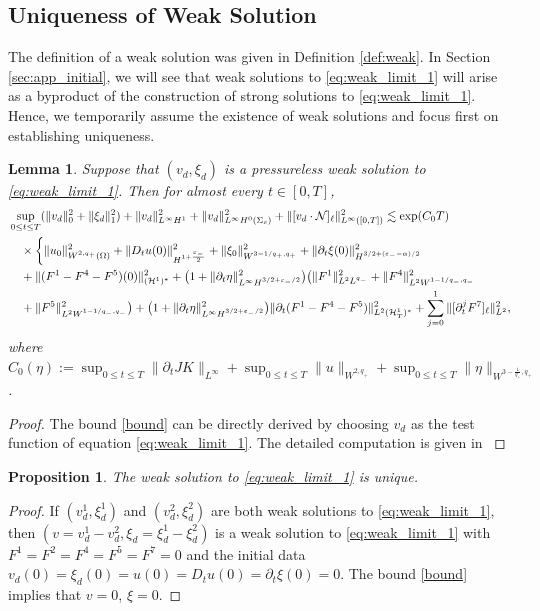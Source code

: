 \documentclass[letterpaper,reqno,10pt,twoside]{amsart}
\newtheorem{lemma}[theorem]{Lemma}
\newtheorem{proposition}[theorem]{Proposition}
\theoremstyle{definition}
\theoremstyle{remark}
\def\p{\partial}
\def\Om{\Omega}
\begin{document}
	
	\subsection{Uniqueness of Weak Solution}
	
	
	The definition of a weak solution was given in Definition \ref{def:weak}.
	In Section \ref{sec:app_initial}, we will see that weak solutions to \eqref{eq:weak_limit_1} will arise  as a byproduct of the construction of strong solutions to \eqref{eq:weak_limit_1}. Hence, we temporarily assume the existence of weak solutions and focus first on establishing uniqueness.
	
	\begin{lemma}{\label{elemma}}
		Suppose that $(v_{d}, \xi_{d})$ is a pressureless weak solution to \eqref{eq:weak_limit_1}. Then for almost every $t\in [0,T]$,
		\begin{equation}{\label{bound}}
			\begin{aligned}
				&\sup_{0\le t\le T}(\|v_{d}\|_{0}^2+\|\xi_{d}\|_1^2)+\|v_{d}\|_{L^\infty H^1}^2+\|v_{d}\|_{L^\infty H^0(\Sigma_s)}^2+\|[v_{d}\cdot\mathcal{N}]_\ell\|_{L^\infty([0,T])}^2
				\lesssim\exp(C_{0}T)\\
				&\quad\times\bigg\{\|u_0\|^{2}_{W^{2,q_+}(\Om)}+\|D_{t}u(0)\|^{2}_{H^{1+\frac{\varepsilon_{-}}{2}}}+\|\xi_0\|^{2}_{W^{3-1/q_+, q_+}}+\|\p_t\xi(0)\|^{2}_{H^{3/2+(\varepsilon_--\alpha)/2}}\\
				&\quad+\|(F^1-F^4-F^5)(0)\|^{2}_{(\mathcal{H}^1)^\ast}+\big(1+\|\p_t\eta\|_{L^\infty H^{3/2+\varepsilon_-/2}}^2\big)\big(\|F^1\|_{L^2L^{q_-}}^2+\|F^4\|_{L^2W^{1-1/q_-,q_-}}^2\\
				&\quad+\|F^5\|_{L^2W^{1-1/q_-,q_-}}^2\big)+\big(1+\|\p_t\eta\|_{L^\infty H^{3/2+\varepsilon_-/2}}^2\big)\|\p_t(F^1-F^4-F^5)\|_{L^{2}(\mathcal{H}^1_T)^{\ast}}^2
				+\sum_{j=0}^1\|[\p_{t}^{j}F^{7}]_\ell\|_{L^2}^2,
			\end{aligned}
		\end{equation}
		where $C_0(\eta):=\sup_{0\le t\le T}\|\p_tJK\|_{L^\infty}+\sup_{0\le t\le T}\|u\|_{W^{2,q_{+}}}+\sup_{0\le t\le T}\|\eta\|_{W^{3-\frac{1}{q_{+}},q_{+}}}$.
	\end{lemma}
	\begin{proof}
		The bound \eqref{bound} can be directly derived by choosing $v_{d}$ as the test function of equation \eqref{eq:weak_limit_1}. The detailed computation is given in \cite{GT2020}
	\end{proof}
	\begin{proposition}\label{prop:unique}
		The weak solution to \eqref{eq:weak_limit_1} is unique.
	\end{proposition}
	\begin{proof}
		If $(v_{d}^1,\xi_{d}^1)$ and $(v_{d}^2,\xi_{d}^2)$ are both weak solutions to \eqref{eq:weak_limit_1}, then $(v=v^1_d-v^2_d,\xi_d=\xi^1_d-\xi^2_d)$ is a weak solution to \eqref{eq:weak_limit_1} with $F^1=F^2=F^4=F^5=F^7=0$ and the initial data $v_d(0)=\xi_d(0)=u(0)= D_tu(0) = \p_t\xi(0)=0$. The bound \eqref{bound} implies that $v=0$, $\xi=0$. 
	\end{proof}
	
\end{document}
